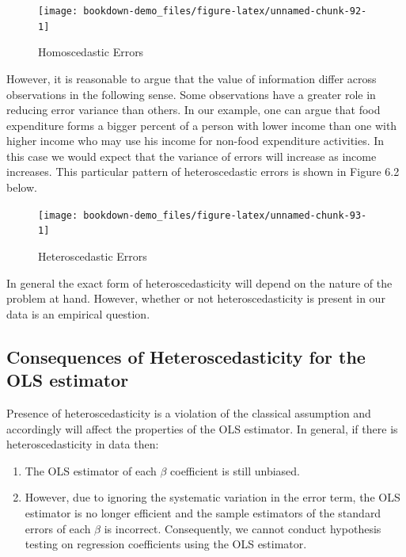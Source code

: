 \documentclass[
]{book}
\theoremstyle{definition}
\theoremstyle{definition}
\theoremstyle{definition}
\theoremstyle{definition}
\theoremstyle{remark}
\begin{document}
\begin{figure}

{\centering \texttt{[image: bookdown-demo\_files/figure-latex/unnamed-chunk-92-1]} 

}

\caption{Homoscedastic Errors}\label{fig:unnamed-chunk-92}
\end{figure}

However, it is reasonable to argue that the value of information differ across observations in the following sense. Some observations have a greater role in reducing error variance than others. In our example, one can argue that food expenditure forms a bigger percent of a person with lower income than one with higher income who may use his income for non-food expenditure activities. In this case we would expect that the variance of errors will increase as income increases. This particular pattern of heteroscedastic errors is shown in Figure 6.2 below.

\begin{figure}

{\centering \texttt{[image: bookdown-demo\_files/figure-latex/unnamed-chunk-93-1]} 

}

\caption{Heteroscedastic Errors}\label{fig:unnamed-chunk-93}
\end{figure}

In general the exact form of heteroscedasticity will depend on the nature of the problem at hand. However, whether or not heteroscedasticity is present in our data is an empirical question.

\hypertarget{consequences-of-heteroscedasticity-for-the-ols-estimator}{%
\subsection{Consequences of Heteroscedasticity for the OLS estimator}\label{consequences-of-heteroscedasticity-for-the-ols-estimator}}

Presence of heteroscedasticity is a violation of the classical assumption and accordingly will affect the properties of the OLS estimator. In general, if there is heteroscedasticity in data then:

\begin{enumerate}
\def\labelenumi{\arabic{enumi}.}
\item
  The OLS estimator of each \(\beta\) coefficient is still unbiased.
\item
  However, due to ignoring the systematic variation in the error term, the OLS estimator is no longer efficient and the sample estimators of the standard errors of each \(\beta\) is incorrect. Consequently, we cannot conduct hypothesis testing on regression coefficients using the OLS estimator.
\end{enumerate}
\end{document}
